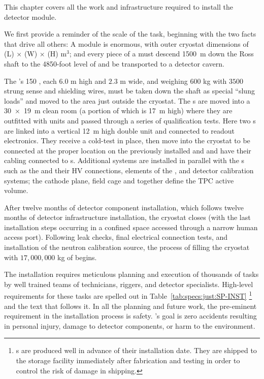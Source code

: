 
This chapter covers all the work and infrastructure required to install the  detector module. 
 
We first provide a reminder of the scale of the task, beginning with the two facts that drive all others: A   module is enormous, with outer cryostat dimensions  of 
\cryostatlen{}(L) $\times$ \cryostatwdth{}(W) $\times$ \cryostatht{}(H) m$^{3}$; 
and every piece of a  must descend 
\SI{1500}{m} down the Ross shaft to the 4850-foot level of  and be transported to a detector cavern.


The 's 150 , each $6.0$ m high and $2.3$ m wide, and  weighing $600$ kg with $3500$ strung sense and shielding wires, must be taken down the shaft as special ``slung loads'' and moved to the area just outside the  cryostat. 
The s are moved into a \SI{30 x 19}{m} clean room (a portion of which is \SI{17}{m} high) where they are outfitted  with  units and passed through a series of qualification tests.
Here two s are linked into a vertical \SI{12}{m} high double unit and connected to readout electronics. 
They receive a cold-test in place, then move into the cryostat to be connected at the proper location on the previously installed  and and have their cabling connected to \fdth{}s. 
Additional systems are installed in parallel with the s such as the  and their HV connections, elements of the , and detector calibration systems; the cathode plane, field cage and  together define the TPC active volume.


After twelve months of detector component installation, which follows twelve months of detector infrastructure installation, the cryostat closes (with the last installation steps occurring in a confined space accessed through a narrow human access port). 
Following leak checks, final electrical connection tests, and installation of the neutron calibration source, the process of filling the cryostat with $17,000,000$ kg of  begins.

The installation requires meticulous planning and execution of thousands of tasks by well trained teams of technicians, riggers, and detector specialists. 
High-level requirements for these tasks are spelled out in Table~\ref{tab:specs:just:SP-INST}
\footnote{s are produced well in advance of their installation date. They are shipped to the storage facility immediately after fabrication and testing in order to control the risk of damage in shipping.} 
and the text that follows it. 
In all the planning and future work, the pre-eminent requirement in the installation process is safety.
's goal is zero accidents resulting in personal injury, damage to detector components, or harm to the environment.


